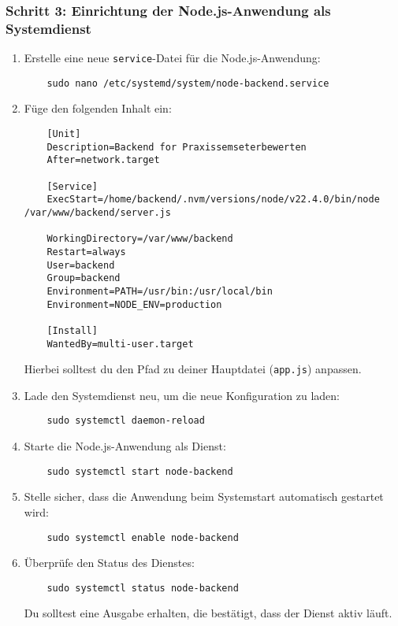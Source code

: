\documentclass[a4paper,12pt]{article}
\begin{document}
\subsubsection{Schritt 3: Einrichtung der Node.js-Anwendung als Systemdienst}
\begin{enumerate}
    \item Erstelle eine neue \texttt{service}-Datei für die Node.js-Anwendung:

    \begin{lstlisting}
    sudo nano /etc/systemd/system/node-backend.service
    \end{lstlisting}
    
    \item Füge den folgenden Inhalt ein:
    
    \begin{lstlisting}
    [Unit]
    Description=Backend for Praxissemseterbewerten
    After=network.target
    
    [Service]
    ExecStart=/home/backend/.nvm/versions/node/v22.4.0/bin/node /var/www/backend/server.js
    
    WorkingDirectory=/var/www/backend
    Restart=always
    User=backend
    Group=backend
    Environment=PATH=/usr/bin:/usr/local/bin
    Environment=NODE_ENV=production
    
    [Install]
    WantedBy=multi-user.target

    \end{lstlisting}
    
    Hierbei solltest du den Pfad zu deiner Hauptdatei (\texttt{app.js}) anpassen.

    \item Lade den Systemdienst neu, um die neue Konfiguration zu laden:

    \begin{lstlisting}
    sudo systemctl daemon-reload
    \end{lstlisting}
    
    \item Starte die Node.js-Anwendung als Dienst:

    \begin{lstlisting}
    sudo systemctl start node-backend
    \end{lstlisting}
    
    \item Stelle sicher, dass die Anwendung beim Systemstart automatisch gestartet wird:

    \begin{lstlisting}
    sudo systemctl enable node-backend
    \end{lstlisting}
    
    \item Überprüfe den Status des Dienstes:

    \begin{lstlisting}
    sudo systemctl status node-backend
    \end{lstlisting}
    
    Du solltest eine Ausgabe erhalten, die bestätigt, dass der Dienst aktiv läuft.
\end{enumerate}
\end{document}
